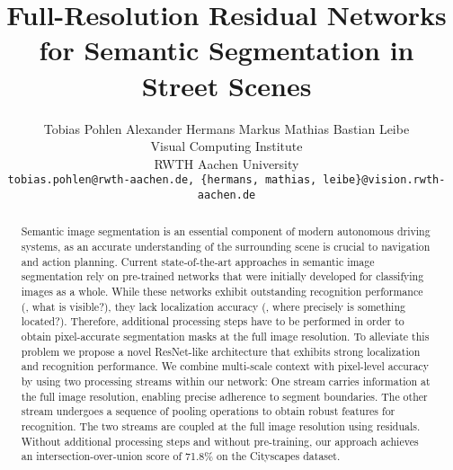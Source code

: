 \documentclass[10pt,twocolumn,letterpaper]{article}
\begin{document}
\title{Full-Resolution Residual Networks for Semantic Segmentation in Street Scenes}

\author{Tobias Pohlen \hspace{10mm} Alexander Hermans \hspace{10mm} Markus Mathias \hspace{10mm} Bastian Leibe\\
Visual Computing Institute\\
RWTH Aachen University\\
{\tt\small tobias.pohlen@rwth-aachen.de, \{hermans, mathias, leibe\}@vision.rwth-aachen.de}
}

\maketitle


\begin{abstract}
Semantic image segmentation is an essential component of modern autonomous driving systems, as
an accurate understanding of the surrounding scene is crucial to navigation and action planning.
Current state-of-the-art approaches in semantic image segmentation rely on pre-trained networks that were initially developed for classifying images as a whole.
While these networks exhibit outstanding recognition performance (\ie, what is visible?), they lack localization accuracy (\ie, where precisely is something located?).
Therefore, additional processing steps have to be performed in order to obtain pixel-accurate segmentation masks at the full image resolution.
To alleviate this problem we propose a novel ResNet-like architecture that exhibits strong localization and recognition performance.
We combine multi-scale context with pixel-level accuracy by using two processing streams within our network:
One stream carries information at the full image resolution, enabling precise adherence to segment boundaries.
The other stream undergoes a sequence of pooling operations to obtain robust features for recognition.
The two streams are coupled at the full image resolution using residuals.
Without additional processing steps and without pre-training, our approach achieves an intersection-over-union score of 71.8\% on the Cityscapes dataset.
\vspace{-5pt}
\end{abstract}
\end{document}
